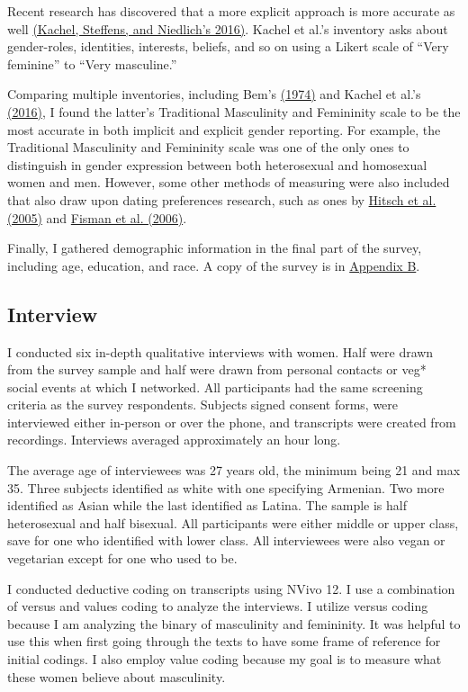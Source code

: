 \documentclass[twoside]{report}
\begin{document}
\begin{multicols}{2}
Recent research has discovered that a more explicit approach is more accurate as well \hyperlink{kachel}{(Kachel, Steffens, and Niedlich's 2016)}. Kachel et al.'s inventory asks about gender-roles, identities, interests, beliefs, and so on using a Likert scale of ``Very feminine'' to ``Very masculine.'' 

Comparing multiple inventories, including Bem's \hyperlink{bem}{(1974)} and Kachel et al.'s \hyperlink{kachel}{(2016)}, I found the latter's
Traditional Masculinity and Femininity scale to be the most accurate in
both implicit and explicit gender reporting. For example, the Traditional Masculinity and Femininity scale was one of the only ones to distinguish in gender expression between both heterosexual and homosexual women and men. However, some other methods of measuring were also included that also draw upon dating preferences research, such as ones by \hyperlink{hitsch1}{Hitsch et al. (2005)} and \hyperlink{fisman}{Fisman et al. (2006)}. 

Finally, I gathered demographic information in the final part of the survey, including age, education, and race. A copy of the survey is in  \hyperlink{appendix-b}{Appendix B}.

\subsection{Interview}

I conducted six in-depth qualitative interviews with women. Half were drawn from the survey sample and half were drawn from personal contacts or veg* social events at which I networked. All participants had the same screening criteria as the survey respondents. Subjects signed consent forms, were interviewed either in-person or over the phone, and transcripts were created from recordings. Interviews averaged approximately an hour long.

The average age of interviewees was 27 years old, the minimum being 21 and max 35. Three subjects identified as white with one specifying Armenian. Two more
identified as Asian while the last identified as Latina. The sample is
half heterosexual and half bisexual. All participants were either middle
or upper class, save for one who identified with lower class. All
interviewees were also vegan or vegetarian except for one who used to be.

I conducted deductive coding on transcripts using NVivo 12. I use a
combination of versus and values coding to analyze the interviews. I
utilize versus coding because I am analyzing the binary of masculinity
and femininity. It was helpful to use this when first going through the
texts to have some frame of reference for initial codings. I also employ
value coding because my goal is to measure what these women believe
about masculinity. 


\end{multicols}
\end{document}
